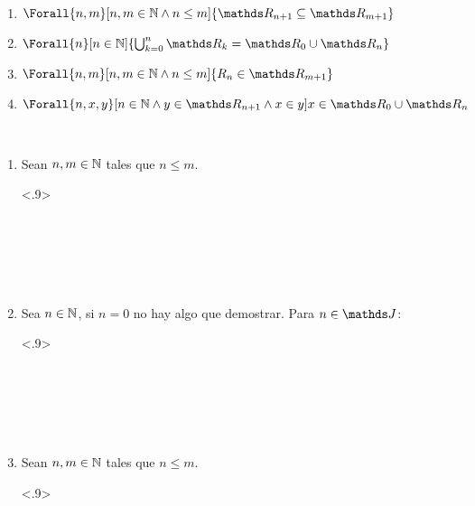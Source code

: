 \begin{lemma}[Propiedades de $\R_n$]\label{lema:Rn}~
  \begin{enumerate}
    \item $\Forall{n,m}[n,m\in\N \land n\leq m]{\R_{n+1} \subseteq \R_{m+1}}$
    \item $\Forall{n}[n\in\N]{\bigcup_{k=0}^n \R_k = \R_0 \cup \R_n}$
    \item $\Forall{n,m}[n,m\in\N \land n \leq m]{R_n \in \R_{m+1}}$
    \item $\Forall{n,x,y}[n\in\N \land y\in\R_{n+1} \land x\in y]{x\in\R_0\cup\R_n}$
  \end{enumerate}
\end{lemma}
\begin{demo}~
  \begin{enumerate}
    \item Sean $n,m\in\mathbb{N}$ tales que $n\leq m$.
          \begin{longderivation}<.9>
              \\
            \equiv\\
              \\
            \To\\
              \\
            \equiv\\
          \end{longderivation}
    \item Sea $n\in\mathbb{N}$, si $n=0$ no hay algo que demostrar. Para $n\in\J$:
          \begin{longderivation}<.9>
              \\
            \equiv\\
              \\
            \\
              \\
            \equiv\\
          \end{longderivation}
    \item Sean $n,m \in \mathbb{N}$ tales que $n \leq m$.
          \begin{longderivation}<.9>
              \\
            \equiv\\

\end{longderivation}
\end{enumerate}
\end{demo}
